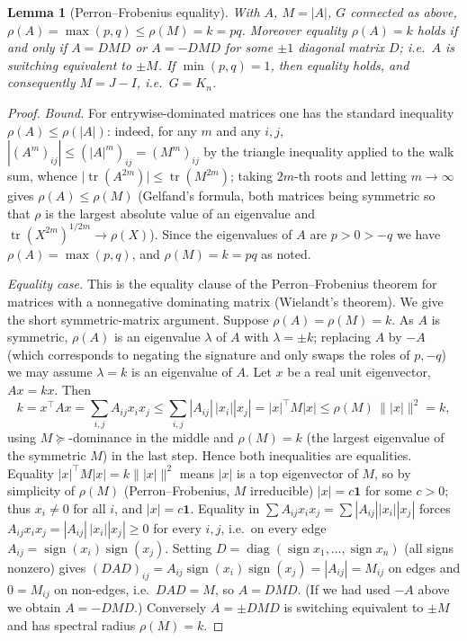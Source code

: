 \documentclass{amsart}
\newtheorem{lemma}{Lemma}
\theoremstyle{definition}
\begin{document}
\begin{lemma}[Perron--Frobenius equality]\label{lem:perron}
With $A$, $M=|A|$, $G$ connected as above, $\rho(A)=\max(p,q)\le\rho(M)=k=pq$.
Moreover equality $\rho(A)=k$ holds if and only if $A=DMD$ or $A=-DMD$ for some
$\pm1$ diagonal matrix $D$; i.e.\ $A$ is switching equivalent to $\pm M$. If
$\min(p,q)=1$, then equality holds, and consequently $M=J-I$, i.e.\ $G=K_n$.
\end{lemma}

\begin{proof}
\emph{Bound.} For entrywise-dominated matrices one has the standard inequality
$\rho(A)\le\rho(|A|)$: indeed, for any $m$ and any $i,j$,
$|(A^m)_{ij}|\le(|A|^m)_{ij}=(M^m)_{ij}$ by the triangle inequality applied to
the walk sum, whence $\bigl|\operatorname{tr}(A^{2m})\bigr|\le
\operatorname{tr}(M^{2m})$; taking $2m$-th roots and letting $m\to\infty$ gives
$\rho(A)\le\rho(M)$ (Gelfand's formula, both matrices being symmetric so that
$\rho$ is the largest absolute value of an eigenvalue and
$\operatorname{tr}(X^{2m})^{1/2m}\to\rho(X)$). Since the eigenvalues of $A$ are
$p>0>-q$ we have $\rho(A)=\max(p,q)$, and $\rho(M)=k=pq$ as noted.

\emph{Equality case.} This is the equality clause of the Perron--Frobenius
theorem for matrices with a nonnegative dominating matrix (Wielandt's theorem).
We give the short symmetric-matrix argument. Suppose $\rho(A)=\rho(M)=k$. As
$A$ is symmetric, $\rho(A)$ is an eigenvalue $\lambda$ of $A$ with
$\lambda=\pm k$; replacing $A$ by $-A$ (which corresponds to negating the
signature and only swaps the roles of $p,-q$) we may assume $\lambda=k$ is an
eigenvalue of $A$. Let $x$ be a real unit eigenvector, $Ax=kx$. Then
\[
k=x^\top A x=\sum_{i,j}A_{ij}x_ix_j\le\sum_{i,j}|A_{ij}|\,|x_i||x_j|
=|x|^\top M|x|\le\rho(M)\,\bigl\||x|\bigr\|^2=k,
\]
using $M\succeq$-dominance in the middle and $\rho(M)=k$ (the largest
eigenvalue of the symmetric $M$) in the last step. Hence both inequalities are
equalities. Equality $|x|^\top M|x|=k\||x|\|^2$ means $|x|$ is a top
eigenvector of $M$, so by simplicity of $\rho(M)$ (Perron--Frobenius,
$M$ irreducible) $|x|=c\mathbf1$ for some $c>0$; thus $x_i\ne0$ for all $i$, and
$|x|=c\mathbf 1$. Equality in $\sum A_{ij}x_ix_j=\sum|A_{ij}||x_i||x_j|$ forces
$A_{ij}x_ix_j=|A_{ij}|\,|x_i||x_j|\ge0$ for every $i,j$, i.e.\ on every edge
$A_{ij}=\operatorname{sign}(x_i)\operatorname{sign}(x_j)$. Setting
$D=\operatorname{diag}(\operatorname{sign}x_1,\dots,\operatorname{sign}x_n)$
(all signs nonzero) gives $(DAD)_{ij}=A_{ij}\operatorname{sign}(x_i)
\operatorname{sign}(x_j)=|A_{ij}|=M_{ij}$ on edges and $0=M_{ij}$ on non-edges,
i.e.\ $DAD=M$, so $A=DMD$. (If we had used $-A$ above we obtain $A=-DMD$.)
Conversely $A=\pm DMD$ is switching equivalent to $\pm M$ and has spectral
radius $\rho(M)=k$.


\end{proof}
\end{document}
